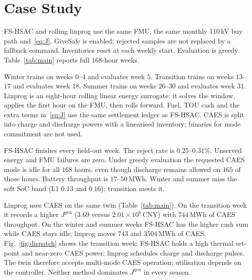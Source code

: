 \documentclass[conference]{IEEEtran}
\begin{document}
\section{Case Study}
\label{sec:exp}

FS-HSAC and rolling linprog use the same FMU, the same monthly 110\,kV buy path and~\eqref{eq:J}. GiveSafe is enabled; rejected samples are not replaced by a fallback command. Inventories reset at each weekly start. Evaluation is greedy. Table~\ref{tab:main} reports full \(168\)-hour weeks.

Winter trains on weeks \(0\)--\(4\) and evaluates week \(5\). Transition trains on weeks \(13\)--\(17\) and evaluates week \(18\). Summer trains on weeks \(26\)--\(30\) and evaluates week \(31\). Linprog is an eight-hour rolling linear energy surrogate: it solves the window, applies the first hour on the FMU, then rolls forward. Fuel, TOU cash and the extra terms in~\eqref{eq:J} use the same settlement ledger as FS-HSAC. CAES is split into charge and discharge powers with a linearised inventory; binaries for mode commitment are not used.

FS-HSAC finishes every held-out week. The reject rate is \(0.25\)--\(0.31\%\). Unserved energy and FMU failures are zero. Under greedy evaluation the requested CAES mode is idle for all \(168\) hours, even though discharge remains allowed on \(165\) of those hours. Battery throughput is \(17\)--\(50\)\,MWh. Winter and summer miss the soft SoC band (L1 \(0.13\) and \(0.16\)); transition meets it.

Linprog uses CAES on the same twin (Table~\ref{tab:main}). On the transition week it records a higher \(J^{\mathrm{gen}}\) (\(3.69\) versus \(2.01\times 10^{6}\)\,CNY) with \(744\)\,MWh of CAES throughput. On the winter and summer weeks FS-HSAC has the higher cash sum while CAES stays idle; linprog moves \(743\) and \(3504\)\,MWh of CAES. Fig.~\ref{fig:dispatch} shows the transition week: FS-HSAC holds a high thermal set-point and near-zero CAES power; linprog schedules charge and discharge pulses. The twin therefore accepts multi-mode CAES operation; utilisation depends on the controller. Neither method dominates \(J^{\mathrm{gen}}\) in every season.
\end{document}
